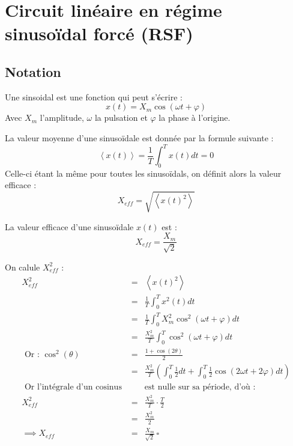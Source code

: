 \chapter{Circuit linéaire en régime sinusoïdal forcé (RSF)}
\section{Notation}

\begin{definition}[Sinusoïdal]
    Une sinsoidal est une fonction qui peut s'écrire : 
    \[
        x(t) = X_{m} \cos \left( \omega t + \varphi \right)
    \]
    Avec \(X_{m}\) l'amplitude, \(\omega\) la pulsation et \(\varphi\) la phase à l'origine.   
\end{definition}

\begin{definition}
    La valeur moyenne d'une sinusoïdale est donnée par la formule suivante : 
    \[
        \left< x(t) \right> = \frac{1}{T} \int_{0}^{T} x(t) dt = 0
    \]
    Celle-ci étant la même pour toutes les sinusoïdals, on définit alors la valeur efficace : 
    \[
        X_{eff} = \sqrt{\left< x(t)^{2} \right>}
    \]
\end{definition}

\begin{theorem}
    La valeur efficace d'une sinusoïdale \(x(t)\) est : 
    \[
        X_{eff} = \frac{X_{m}}{\sqrt{2}}
    \]
    \begin{explanation}
        On calule \(X_{eff}^{2}\) : 
        \begin{eqnarray*}
            X_{eff}^{2} &=& \left< x(t)^{2} \right> \\
            &=& \frac{1}{T} \int_{0}^{T} x^{2}(t) dt \\
            &=& \frac{1}{T} \int_{0}^{T} X_{m}^{2}\cos^{2}(\omega t + \varphi) dt \\
            &=& \frac{X_{m}^{2}}{T} \int_{0}^{T} \cos^{2}(\omega t + \varphi) dt \\
            \text{ Or :  } \cos^{2}(\theta) &=& \frac{1+\cos(2\theta)}{2} \\
            &=& \frac{X_{m}^{2}}{T} \left( \int_{0}^{T} \frac{1}{2} dt + \int_{0}^{T} \frac{1}{2}\cos(2\omega t + 2\varphi) dt \right) \\
            \text{ Or l'intégrale d'un cosinus } && \text{est nulle sur sa période, d'où : }\\
            X_{eff}^{2} &=& \frac{X_{m}^{2}}{T} \cdot \frac{T}{2} \\
            &=& \frac{X_{m}^{2}}{2} \\
            \implies X_{eff} &=& \frac{X_{m}}{\sqrt{2}} \,\square
        \end{eqnarray*}
    \end{explanation}
\end{theorem}

